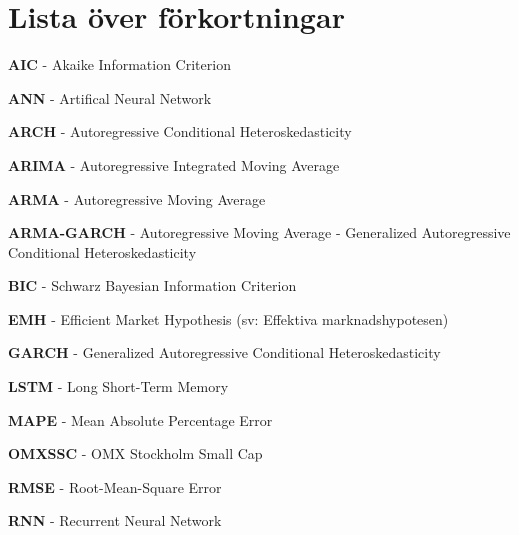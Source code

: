 \documentclass[12pt]{article}
\begin{document}
\newpage 

\section*{Lista över förkortningar}
\textbf{AIC} - Akaike Information Criterion \par
\textbf{ANN} - Artifical Neural Network \par
\textbf{ARCH} - Autoregressive Conditional Heteroskedasticity \par
\textbf{ARIMA} - Autoregressive Integrated Moving Average \par
\textbf{ARMA} - Autoregressive Moving Average \par 
\textbf{ARMA-GARCH} - Autoregressive Moving Average - Generalized Autoregressive Conditional Heteroskedasticity \par 
\textbf{BIC} - Schwarz Bayesian Information Criterion \par
\textbf{EMH} - Efficient Market Hypothesis (sv: Effektiva marknadshypotesen) \par
\textbf{GARCH} - Generalized Autoregressive Conditional Heteroskedasticity \par
\textbf{LSTM} - Long Short-Term Memory \par
\textbf{MAPE} - Mean Absolute Percentage Error \par
\textbf{OMXSSC} - OMX Stockholm Small Cap \par
\textbf{RMSE} - Root-Mean-Square Error \par
\textbf{RNN} - Recurrent Neural Network \par

\newpage
\clearpage
\setcounter{page}{1}
\end{document}
